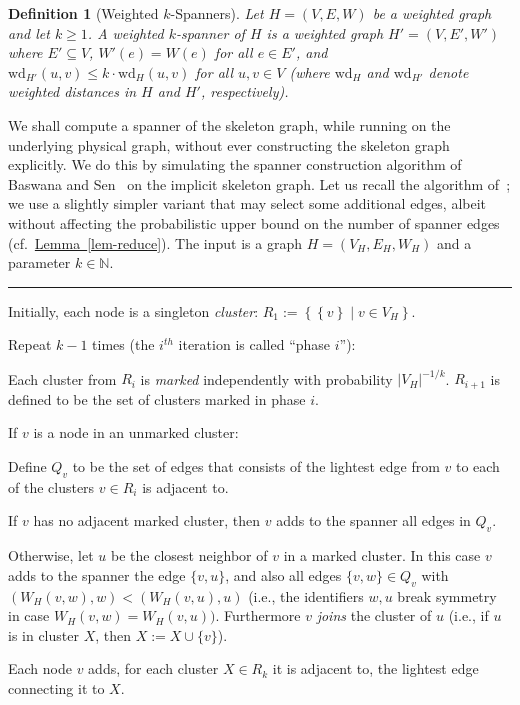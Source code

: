 \documentclass[letterpaper,11pt]{article}
\newcommand{\namedref}[2]{\hyperref[#2]{#1~\ref*{#2}}}
\newcommand{\lemmaref}[1]{\namedref{Lemma}{#1}}
\newtheorem{definition}[theorem]{Definition}
\newcommand{\N}{\mathbb{N}}
\newcommand{\Set}[1]{\left\{ #1 \right\}}
\newcommand{\Wd}{\mathrm{wd}}
\begin{document}
\begin{definition}[Weighted $k$-Spanners]
Let $H=(V,E,W)$ be a weighted graph and let $k\ge 1$. A weighted $k$-spanner of
$H$ is a weighted graph $H'=(V,E',W')$ where $E'\subseteq V$,
$W'(e)=W(e)$ for all $e\in E'$, and $\Wd_{H'}(u,v)\le k\cdot\Wd_H(u,v)$ for
all $u,v\in V$ (where $\Wd_H$ and $\Wd_{H'}$ denote weighted distances in $H$
and $H'$, respectively).
\end{definition}
We shall compute a spanner of the skeleton graph, while running
on the underlying physical graph, without ever
constructing the skeleton graph explicitly. We do this by
simulating the spanner construction algorithm of Baswana and
Sen~\cite{baswana07} on the implicit skeleton graph. Let us recall the
algorithm of~\cite{baswana07}; we use a slightly simpler variant that may select
some additional edges, albeit without affecting the probabilistic upper bound on
the number of spanner edges (cf.~\lemmaref{lem-reduce}). The input is a graph
$H=(V_H,E_H,W_H)$ and a parameter $k\in \N$.
\vspace*{1ex}\hrule
\begin{compactenum}
\item Initially, each node is a singleton \emph{cluster}:
$R_1:=\Set{\Set{v}\mid v\in V_H}$.
\item Repeat $k-1$ times (the $i^{th}$ iteration is called ``phase $i$''):
\begin{compactenum}
\item Each cluster from $R_i$ is \emph{marked} independently
with probability $|V_H|^{-1/k}$. $R_{i+1}$ is defined to be the set of
clusters marked in phase $i$.
\item \label{bs-first} If $v$ is a node in an unmarked cluster:
\begin{compactenum}
\item Define $Q_v$ to be the set of edges that consists of the lightest edge
from $v$ to each of the clusters $v\in R_i$ is adjacent to.
\item If $v$ has no adjacent marked cluster, then $v$ adds to the
spanner all edges in $Q_v$.
\item Otherwise, let $u$ be the closest neighbor of $v$ in a
marked cluster. In this case $v$ adds to the spanner the edge
$\{v,u\}$, and also all edges $\{v,w\}\in Q_v$ with $(W_H(v,w),w)<(W_H(v,u),u)$
(i.e., the identifiers $w,u$ break symmetry in case $W_H(v,w)=W_H(v,u))$.
Furthermore $v$ \emph{joins} the cluster of $u$ (i.e., if $u$ is in cluster $X$,
then $X:=X\cup \{v\}$).
\end{compactenum}
\end{compactenum}
\item \label{bs-final}
Each node $v$ adds, for each cluster $X\in R_k$ it is adjacent to, the lightest
edge connecting it to $X$.
\end{compactenum}\smallskip
\end{document}

